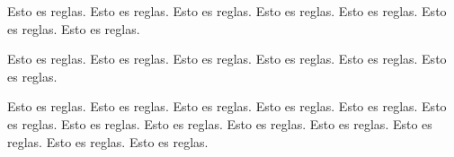 Esto es reglas. Esto es reglas. Esto es reglas. Esto es reglas. Esto es reglas. Esto es reglas. Esto es reglas. 

Esto es reglas. Esto es reglas. Esto es reglas. Esto es reglas. Esto es reglas. Esto es reglas. 

Esto es reglas. Esto es reglas. Esto es reglas. Esto es reglas. Esto es reglas. Esto es reglas. Esto es reglas. Esto es reglas. Esto es reglas. Esto es reglas. Esto es reglas. Esto es reglas. Esto es reglas. 